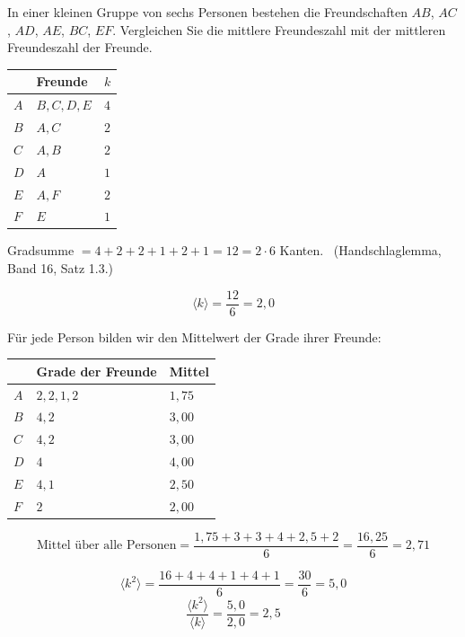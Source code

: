 \begin{aufgabe}
In einer kleinen Gruppe von sechs Personen bestehen die Freundschaften $AB$, $AC$, $AD$, $AE$, $BC$, $EF$. Vergleichen Sie die mittlere Freundeszahl mit der mittleren Freundeszahl der Freunde.

\loesung
{}
\begin{center}
\renewcommand{\arraystretch}{1.42}
\begin{tabular}{@{}P{1.2cm}P{3.2cm}P{1.4cm}@{}}
\toprule
& \textbf{Freunde} & $k$\\
\midrule
$A$ & $B, C, D, E$ & $4$\\
$B$ & $A, C$ & $2$\\
$C$ & $A, B$ & $2$\\
$D$ & $A$ & $1$\\
$E$ & $A, F$ & $2$\\
$F$ & $E$ & $1$\\
\bottomrule
\end{tabular}
\end{center}

Gradsumme $= 4+2+2+1+2+1 = 12 = 2 \cdot 6$ Kanten. \checkmark\ (Handschlaglemma, Band 16, Satz 1.3.)

\[ \langle k\rangle = \frac{12}{6} = 2{,}0 \]

Für jede Person bilden wir den Mittelwert der Grade ihrer Freunde:
\begin{center}
\renewcommand{\arraystretch}{1.42}
\begin{tabular}{@{}P{1.2cm}P{3.0cm}P{2.0cm}@{}}
\toprule
& \textbf{Grade der Freunde} & \textbf{Mittel}\\
\midrule
$A$ & $2,2,1,2$ & $1{,}75$\\
$B$ & $4,2$ & $3{,}00$\\
$C$ & $4,2$ & $3{,}00$\\
$D$ & $4$ & $4{,}00$\\
$E$ & $4,1$ & $2{,}50$\\
$F$ & $2$ & $2{,}00$\\
\bottomrule
\end{tabular}
\end{center}

\[ \text{Mittel über alle Personen} = \frac{1{,}75+3+3+4+2{,}5+2}{6} = \frac{16{,}25}{6} = 2{,}71 \]

\[ \langle k^2\rangle = \frac{16+4+4+1+4+1}{6} = \frac{30}{6} = 5{,}0 \]
\[ \frac{\langle k^2\rangle}{\langle k\rangle} = \frac{5{,}0}{2{,}0} = 2{,}5 \]


\end{aufgabe}
